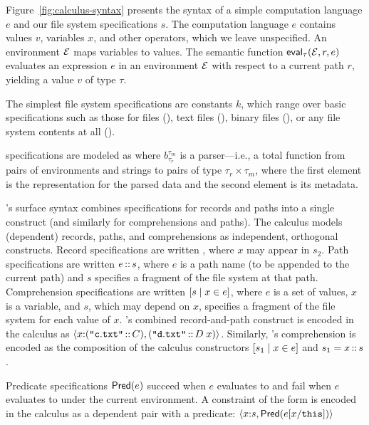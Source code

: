 Figure~\ref{fig:calculus-syntax} presents the syntax of a simple
computation language $e$ and our file system specifications $s$.  The
computation language $e$ contains values $v$, variables $x$, and other
operators, which we leave unspecified.  An environment $\mathcal{E}$ maps
variables to values.  The semantic function $\mathsf{eval}_{\tau}(\mathcal{E},r,e)$
evaluates an expression $e$ in an environment $\mathcal{E}$ with respect to a
current path $r$, yielding a value $v$ of type $\tau$.

%
The simplest file system specifications are constants $k$, which range
over basic specifications such as those for files (\pfile), text files
(\ptext), binary files (\pbin), or any file system contents at all
(\pany).

\padshaskell{} specifications are modeled as  where
$b^{\tau_m}_{\tau_r}$ is a parser---i.e., a total function from pairs
of environments and strings to pairs of type $\tau_r \times \tau_m$,
where the first element is the representation for the parsed data and
the second element is its metadata.

\forest{}'s surface syntax combines specifications for records and
paths into a single construct (and similarly for comprehensions and
paths). The calculus models (dependent) records, paths, and
comprehensions as independent, orthogonal constructs.  Record
specifications are written , where $x$ may appear
in $s_2$.  Path specifications are written $e\,{::}\,s$, where $e$
is a path name (to be appended to the current path) and $s$ specifies
a fragment of the file system at that path. Comprehension
specifications are written $[ s \mid x \in e ]$, where $e$ is a set of
values, $x$ is a variable, and $s$, which may depend on $x$, specifies
a fragment of the file system for each value of $x$.  \forest{}'s
combined record-and-path construct  is encoded in the calculus as
$\langle x {:} (\texttt{"}\mathtt{c.txt}\texttt{"}\,{::}\,C), (\texttt{"}\mathtt{d.txt}\texttt{"}\,{::}\,D\;
    x) \rangle$.  Similarly, \forest{}'s comprehension \cd{[x :: s | x <-
  e]} is encoded as the composition of the calculus constructors
$[ s_1 \mid x \in e ]$ and $s_1 = x\,{::}\,s$.

Predicate specifications $\mathsf{Pred}(e)$ succeed when $e$ evaluates to
\True{} and fail when $e$ evaluates to \False{} under the current
environment.  A \forest{} constraint of the form  is
encoded in the calculus as a dependent pair with a predicate:
$\langle x {:} s, \mathsf{Pred}(e[x/\mathtt{this}]) \rangle$

